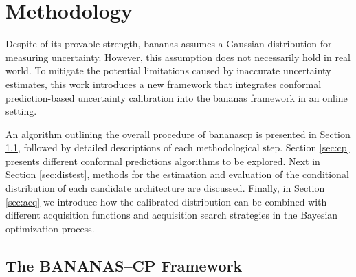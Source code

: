 \chapter{Methodology}
\label{ch3}
Despite of its provable strength, \gls{bananas} assumes a Gaussian distribution for measuring uncertainty. However, this assumption does not necessarily hold in real world. To mitigate the potential limitations caused by inaccurate uncertainty estimates, this work introduces a new framework that integrates conformal prediction-based uncertainty calibration into the \gls{bananas} framework in an online setting. 

An algorithm outlining the overall procedure of \gls{bananascp} is presented in Section \ref{sec:overview}, followed by detailed descriptions of each methodological step. Section \ref{sec:cp} presents different conformal predictions algorithms to be explored. Next in Section \ref{sec:distest}, methods for the estimation and evaluation of the conditional distribution of each candidate architecture are discussed. Finally, in Section \ref{sec:acq} we introduce how the calibrated distribution can be combined with different acquisition functions and acquisition search strategies in the Bayesian optimization process.


\section{The BANANAS--CP Framework}
\label{sec:overview}

